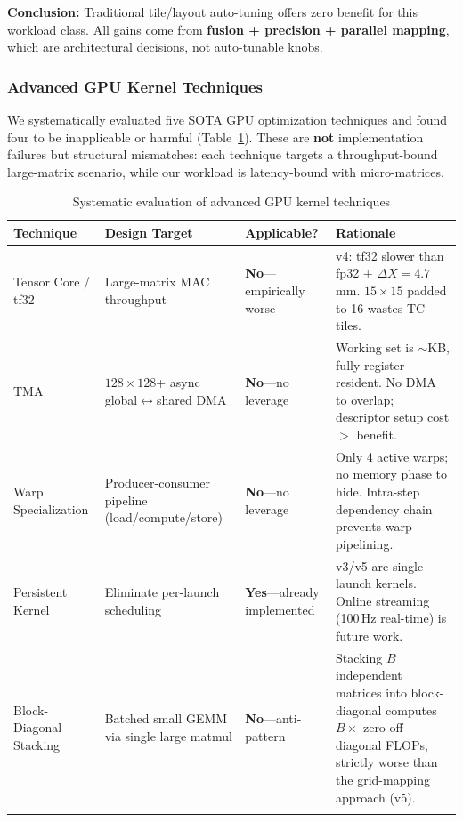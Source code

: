 \documentclass[pdflatex,sn-mathphys-num]{sn-jnl}%
\theoremstyle{thmstyleone}%
\theoremstyle{thmstyletwo}%
\theoremstyle{thmstylethree}%
\begin{document}
\textbf{Conclusion:} Traditional tile/layout auto-tuning offers zero benefit for this workload class. All gains come from \textbf{fusion + precision + parallel mapping}, which are architectural decisions, not auto-tunable knobs.

\subsubsection{Advanced GPU Kernel Techniques}

We systematically evaluated five SOTA GPU optimization techniques and found four to be inapplicable or harmful (Table~\ref{tab:techniques}). These are \textbf{not} implementation failures but structural mismatches: each technique targets a throughput-bound large-matrix scenario, while our workload is latency-bound with micro-matrices.

\begin{table}[h]
\caption{Systematic evaluation of advanced GPU kernel techniques}\label{tab:techniques}
\begin{tabular}{@{}lp{3.5cm}p{2.5cm}p{4cm}@{}}
\toprule
Technique & Design Target & Applicable? & Rationale \\
\midrule
Tensor Core / tf32 & Large-matrix MAC throughput & \textbf{No}---empirically worse & v4: tf32 slower than fp32 + $\Delta X=4.7$\,mm. $15\times15$ padded to 16 wastes TC tiles. \\
TMA & $128\times128$+ async global$\leftrightarrow$shared DMA & \textbf{No}---no leverage & Working set is $\sim$KB, fully register-resident. No DMA to overlap; descriptor setup cost $>$ benefit. \\
Warp Specialization & Producer-consumer pipeline (load/compute/store) & \textbf{No}---no leverage & Only 4 active warps; no memory phase to hide. Intra-step dependency chain prevents warp pipelining. \\
Persistent Kernel & Eliminate per-launch scheduling & \textbf{Yes}---already implemented & v3/v5 are single-launch kernels. Online streaming (100\,Hz real-time) is future work. \\
Block-Diagonal Stacking & Batched small GEMM via single large matmul & \textbf{No}---anti-pattern & Stacking $B$ independent matrices into block-diagonal computes $B\times$ zero off-diagonal FLOPs, strictly worse than the grid-mapping approach (v5). \\
\botrule
\end{tabular}
\end{table}
\end{document}
